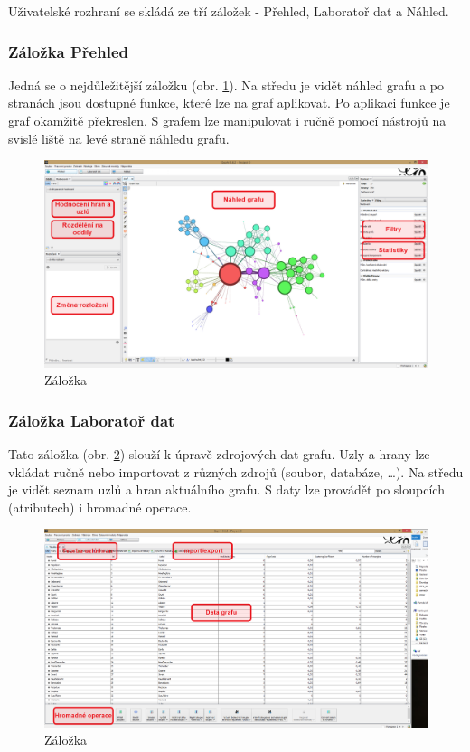 \documentclass[thesis=M,czech]{FITthesis}[2014/05/6]
\begin{document}
Uživatelské rozhraní se skládá ze tří záložek - Přehled, Laboratoř dat a Náhled.

\subsubsection{Záložka Přehled}
Jedná se o nejdůležitější záložku (obr. \ref{fig:gephi-overview}). Na středu je vidět náhled grafu a po stranách jsou dostupné funkce, které lze na graf aplikovat. Po
aplikaci funkce je graf okamžitě překreslen. S grafem lze manipulovat i ručně pomocí nástrojů na svislé liště na levé straně náhledu grafu.

\begin{figure}\centering
 	\includegraphics[width=1\textwidth]{images/gephi/gephi_overview_final}
 	\caption[Záložka ]{Záložka }\label{fig:gephi-overview}
\end{figure}

\subsubsection{Záložka Laboratoř dat}
Tato záložka (obr. \ref{fig:gephi-lab}) slouží k úpravě zdrojových dat grafu. Uzly a hrany lze vkládat ručně nebo importovat z různých zdrojů (soubor, databáze, \ldots). Na středu je vidět
seznam uzlů a hran aktuálního grafu. S daty lze provádět po sloupcích (atributech) i hromadné operace.

\begin{figure}\centering
 	\includegraphics[width=1\textwidth]{images/gephi/gephi_lab_final}
 	\caption[Záložka ]{Záložka }\label{fig:gephi-lab}
\end{figure}
\end{document}
